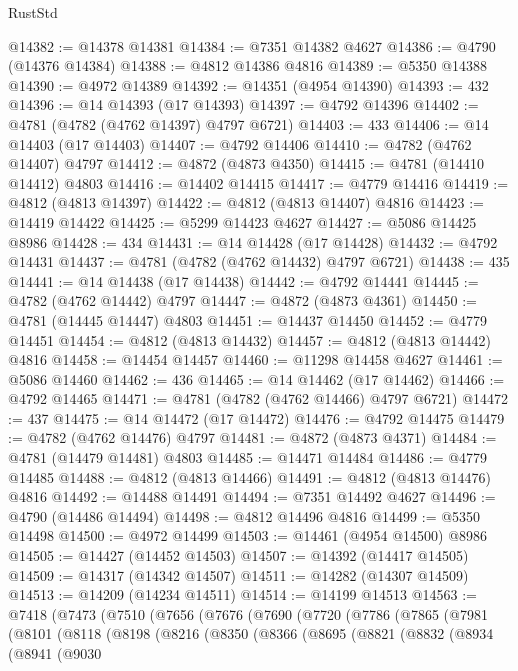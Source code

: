 \begin{lexlean}{RustStd}
\begin{coremodule}
@14382 := @14378 @14381
@14384 := @7351 @14382 @4627
@14386 := @4790 (@14376 @14384)
@14388 := @4812 @14386 @4816
@14389 := @5350 @14388
@14390 := @4972 @14389
@14392 := @14351 (@4954 @14390)
@14393 := 432
@14396 := @14 @14393 (@17 @14393)
@14397 := @4792 @14396
@14402 := @4781 (@4782 (@4762 @14397) @4797 @6721)
@14403 := 433
@14406 := @14 @14403 (@17 @14403)
@14407 := @4792 @14406
@14410 := @4782 (@4762 @14407) @4797
@14412 := @4872 (@4873 @4350)
@14415 := @4781 (@14410 @14412) @4803
@14416 := @14402 @14415
@14417 := @4779 @14416
@14419 := @4812 (@4813 @14397)
@14422 := @4812 (@4813 @14407) @4816
@14423 := @14419 @14422
@14425 := @5299 @14423 @4627
@14427 := @5086 @14425 @8986
@14428 := 434
@14431 := @14 @14428 (@17 @14428)
@14432 := @4792 @14431
@14437 := @4781 (@4782 (@4762 @14432) @4797 @6721)
@14438 := 435
@14441 := @14 @14438 (@17 @14438)
@14442 := @4792 @14441
@14445 := @4782 (@4762 @14442) @4797
@14447 := @4872 (@4873 @4361)
@14450 := @4781 (@14445 @14447) @4803
@14451 := @14437 @14450
@14452 := @4779 @14451
@14454 := @4812 (@4813 @14432)
@14457 := @4812 (@4813 @14442) @4816
@14458 := @14454 @14457
@14460 := @11298 @14458 @4627
@14461 := @5086 @14460
@14462 := 436
@14465 := @14 @14462 (@17 @14462)
@14466 := @4792 @14465
@14471 := @4781 (@4782 (@4762 @14466) @4797 @6721)
@14472 := 437
@14475 := @14 @14472 (@17 @14472)
@14476 := @4792 @14475
@14479 := @4782 (@4762 @14476) @4797
@14481 := @4872 (@4873 @4371)
@14484 := @4781 (@14479 @14481) @4803
@14485 := @14471 @14484
@14486 := @4779 @14485
@14488 := @4812 (@4813 @14466)
@14491 := @4812 (@4813 @14476) @4816
@14492 := @14488 @14491
@14494 := @7351 @14492 @4627
@14496 := @4790 (@14486 @14494)
@14498 := @4812 @14496 @4816
@14499 := @5350 @14498
@14500 := @4972 @14499
@14503 := @14461 (@4954 @14500) @8986
@14505 := @14427 (@14452 @14503)
@14507 := @14392 (@14417 @14505)
@14509 := @14317 (@14342 @14507)
@14511 := @14282 (@14307 @14509)
@14513 := @14209 (@14234 @14511)
@14514 := @14199 @14513
@14563 := @7418
    (@7473
      (@7510
        (@7656
          (@7676
            (@7690
              (@7720
                (@7786
                  (@7865
                    (@7981
                      (@8101
                        (@8118
                          (@8198
                            (@8216
                              (@8350
                                (@8366
                                  (@8695
                                    (@8821
                                      (@8832
                                        (@8934
                                          (@8941
                                            (@9030

\end{coremodule}
\end{lexlean}
